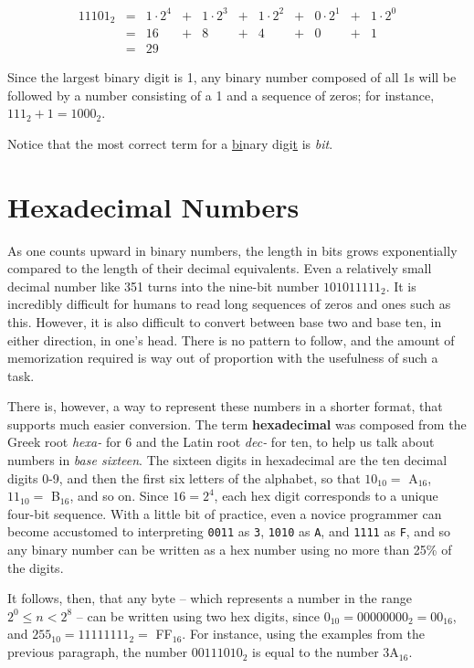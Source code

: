 \begin{equation}
    \begin{array}{ccccccccccc}
    11101_2 &=& 1 \cdot 2^4 &+& 1 \cdot 2^3 &+& 1 \cdot 2^2 &+& 0 \cdot 2^1 &+& 1 \cdot 2^0\\
    &=& 16 &+& 8 &+& 4 &+& 0 &+& 1\\
    &=& 29
\end{array}
\end{equation}

Since the largest binary digit is 1, any binary number composed of all 1s will be followed by a number consisting of a 1 and a sequence of zeros; for instance, $111_2 + 1 = 1000_2$.

Notice that the most correct term for a \underline{bi}nary digi\underline{t} is \textit{bit}.

\setcounter{section}{15}
\section{Hexadecimal Numbers}

As one counts upward in binary numbers, the length in bits grows exponentially compared to the length of their decimal equivalents.  Even a relatively small decimal number like 351 turns into the nine-bit number $101011111_2$.  It is incredibly difficult for humans to read long sequences of zeros and ones such as this.  However, it is also difficult to convert between base two and base ten, in either direction, in one's head.  There is no pattern to follow, and the amount of memorization required is way out of proportion with the usefulness of such a task.

There is, however, a way to represent these numbers in a shorter format, that supports much easier conversion.  The term \textbf{hexadecimal} was composed from the Greek root \textit{hexa-} for 6 and the Latin root \textit{dec-} for ten, to help us talk about numbers in \textit{base sixteen}.  The sixteen digits in hexadecimal are the ten decimal digits 0-9, and then the first six letters of the alphabet, so that $10_{10} =$ A$_{16}$, $11_{10} =$ B$_{16}$, and so on.  Since $16 = 2^4$, each hex digit corresponds to a unique four-bit sequence.  With a little bit of practice, even a novice programmer can become accustomed to interpreting \verb-0011- as \verb-3-, \verb-1010- as \verb-A-, and \verb-1111- as \verb-F-, and so any binary number can be written as a hex number using no more than 25\% of the digits.

It follows, then, that any byte -- which represents a number in the range $2^0 \le n < 2^8$ -- can be written using two hex digits, since $0_{10} = 00000000_2 = 00_{16}$, and $255_{10} = 11111111_2 = $ FF$_{16}$.  For instance, using the examples from the previous paragraph, the number $00111010_2$ is equal to the number 3A$_{16}$.

